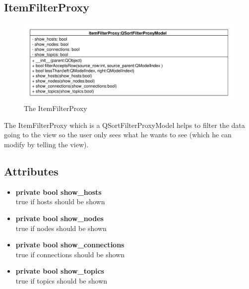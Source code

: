 \subsection{ItemFilterProxy}
\begin{figure}[htbp]
	\begin{minipage}[t]{7cm}
		\vspace{0pt}
		\centering
		\includegraphics[scale=0.6]{./diagram_pictures/ItemFilter.pdf}
		\caption{The ItemFilterProxy}
	\end{minipage}
\end{figure} 
The ItemFilterProxy which is a QSortFilterProxyModel helps to filter the data going to the view so the user only sees what he wants to see (which he can modify by telling the view). 
\subsection{Attributes}
\begin{itemize}
  \item \textbf{private bool show\_hosts}\\
  true if hosts should be shown
  \item \textbf{private bool show\_nodes}\\
  true if nodes should be shown
  \item \textbf{private bool show\_connections}\\
  true if connections should be shown
  \item \textbf{private bool show\_topics}\\
  true if topics should be shown
\end{itemize}

